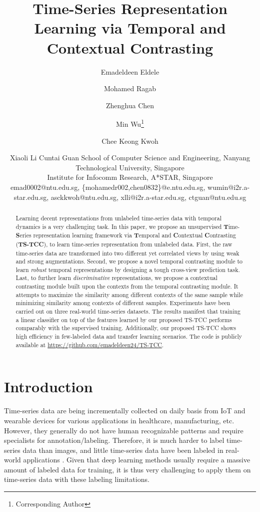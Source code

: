 \documentclass{article}
\title{Time-Series Representation Learning via Temporal and Contextual Contrasting}
\author{
Emadeldeen Eldele \and
Mohamed Ragab\and
Zhenghua Chen\and
Min Wu\footnote{Corresponding Author}\and
Chee Keong Kwoh\and
Xiaoli Li\And
Cuntai Guan
\affiliations
School of Computer Science and Engineering, Nanyang Technological University, Singapore\\
Institute for Infocomm Research, A*STAR, Singapore\\
\emails
emad0002@ntu.edu.sg, \{mohamedr002,chen0832\}@e.ntu.edu.sg, wumin@i2r.a-star.edu.sg, asckkwoh@ntu.edu.sg, xlli@i2r.a-star.edu.sg, ctguan@ntu.edu.sg
}
\begin{document}
\thispagestyle{myheadings}



\maketitle
\begin{abstract}
Learning decent representations from unlabeled time-series data with temporal dynamics is a very challenging task. In this paper, we propose an unsupervised \textbf{T}ime-\textbf{S}eries representation learning framework via \textbf{T}emporal and \textbf{C}ontextual \textbf{C}ontrasting (\textbf{TS-TCC}), to learn time-series representation from unlabeled data. First, the raw time-series data are transformed into two different yet correlated views by using weak and strong augmentations. Second, we propose a novel temporal contrasting module to learn \textit{robust} temporal representations by designing a tough cross-view prediction task. Last, to further learn \textit{discriminative} representations, we propose a contextual contrasting module built upon the contexts from the temporal contrasting module. It attempts to maximize the similarity among different contexts of the same sample while minimizing similarity among contexts of different samples. Experiments have been carried out on three real-world time-series datasets. The results manifest that training a linear classifier on top of the features learned by our proposed TS-TCC performs comparably with the supervised training. Additionally, our proposed TS-TCC shows high efficiency in few-labeled data and transfer learning scenarios. The code is publicly available at \url{https://github.com/emadeldeen24/TS-TCC}. 
\end{abstract}

\section{Introduction}
Time-series data are being incrementally collected on daily basis from IoT and wearable devices for various applications in healthcare, manufacturing, etc. However, they generally do not have human recognizable patterns and require specialists for annotation/labeling. Therefore, it is much harder to label time-series data than images, and little time-series data have been labeled in real-world applications \cite{ching2018opportunities}. Given that deep learning methods usually require a massive amount of labeled data for training, it is thus very challenging to apply them on time-series data with these labeling limitations. 
\end{document}
